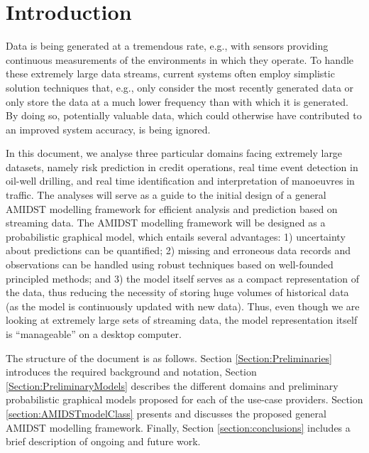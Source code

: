 \section{Introduction}

Data is being generated at a tremendous rate, e.g., with sensors providing continuous measurements of the environments in which they operate. To handle these extremely large data streams, current systems often employ simplistic solution techniques that, e.g., only consider the most recently generated data or only store the data at a much lower frequency than with which it is generated. By doing so, potentially valuable data, which could otherwise have contributed to an improved system accuracy, is being ignored. 

In this document, we analyse three particular domains facing extremely large datasets, namely risk prediction in credit
operations, real time event detection in oil-well drilling, and real time identification and interpretation of manoeuvres
in traffic. The analyses will serve as a guide to the initial design of a general AMIDST modelling framework for efficient analysis and prediction based on streaming data. The AMIDST modelling
framework will be designed as a probabilistic graphical model, which entails several advantages: 1) uncertainty about
predictions can be quantified; 2) missing and erroneous data records and observations can be handled using robust
techniques based on well-founded principled methods; and 3) the model itself serves as a compact representation of the
data, thus reducing the necessity of storing huge volumes of historical data (as the model is continuously updated with
new data). Thus, even though we are looking at extremely large sets of streaming data, the model representation itself is ``manageable'' on a desktop computer.  

The structure of the document is as follows. Section \ref{Section:Preliminaries} introduces the required background and
notation, Section \ref{Section:PreliminaryModels} describes the different domains and preliminary probabilistic graphical models proposed for each of the use-case providers. Section \ref{section:AMIDSTmodelClass} presents and discusses the proposed general AMIDST modelling framework. Finally, Section \ref{section:conclusions} includes a brief description of ongoing and future work.